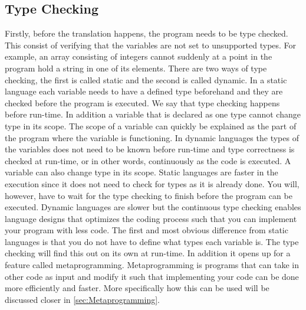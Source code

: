 \subsection{Type Checking}
Firstly, before the translation happens, the program needs to be type checked. This consist of verifying that the variables are not set to unsupported types. For example, an array consisting of integers cannot suddenly at a point in the program hold a string in one of its elements. There are two ways of type checking, the first is called static and the second is called dynamic. In a static language each variable needs to have a defined type beforehand and they are checked before the program is executed. We say that type checking happens before run-time. In addition a variable that is declared as one type cannot change type in its scope. The scope of a variable can quickly be explained as the part of the program where the variable is functioning. In dynamic languages the types of the variables does not need to be known before run-time and type correctness is checked at run-time, or in other words, continuously as the code is executed. A variable can also change type in its scope. Static languages are faster in the execution since it does not need to check for types as it is already done. You will, however, have to wait for the type checking to finish before the program can be executed. Dynamic languages are slower but the continuous type checking enables language designs that optimizes the coding process such that you can implement your program with less code. The first and most obvious difference from static languages is that you do not have to define what types each variable is. The type checking will find this out on its own at run-time. In addition it opens up for a feature called metaprogramming. Metaprogramming is programs that can take in other code as input and modify it such that implementing your code can be done more efficiently and faster. More specifically how this can be used will be discussed closer in \autoref{sec:Metaprogramming}.

